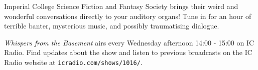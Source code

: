 
Imperial College Science Fiction and Fantasy Society brings their
weird and wonderful conversations directly to your auditory organs!
Tune in for an hour of terrible banter, mysterious music, and possibly
traumatising dialogue.

\textit{Whispers from the Basement} airs every Wednesday afternoon
14:00 - 15:00 on IC Radio. Find updates about the show and listen to
previous broadcasts on the IC Radio website
at \texttt{icradio.com/shows/1016/}.
